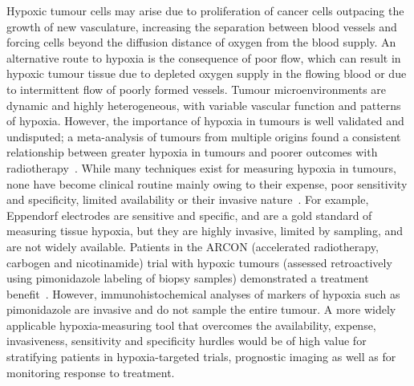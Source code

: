 Hypoxic tumour cells may arise due to proliferation of cancer cells outpacing the growth of new vasculature, increasing the separation between blood vessels and forcing cells beyond the diffusion distance of oxygen from the blood supply. 
An alternative route to hypoxia is the consequence of poor flow, which can result in hypoxic tumour tissue due to depleted oxygen supply in the flowing blood or due to intermittent flow of poorly formed vessels. 
Tumour microenvironments are dynamic and highly heterogeneous, with variable vascular function and patterns of hypoxia.
However, the importance of hypoxia in tumours is well validated and undisputed; a meta-analysis of tumours from multiple origins found a consistent relationship between greater hypoxia in tumours and poorer outcomes with radiotherapy~\cite{Horsman:2012kw}.
While many techniques exist for measuring hypoxia in tumours, none have become clinical routine mainly owing to their expense, poor sensitivity and specificity, limited availability or their invasive nature~\cite{Colliez:2017fc,Baumann:2016gr}. 
For example, Eppendorf electrodes are sensitive and specific, and are a gold standard of measuring tissue hypoxia, but they are highly invasive, limited by sampling, and are not widely available. 
Patients in the ARCON (accelerated radiotherapy, carbogen and nicotinamide) trial with hypoxic tumours (assessed retroactively using pimonidazole labeling of biopsy samples) demonstrated a treatment benefit~\cite{Kaanders:2002wl}.
However, immunohistochemical analyses of markers of hypoxia such as pimonidazole are invasive and do not sample the entire tumour.
A more widely applicable hypoxia-measuring tool that overcomes the availability, expense, invasiveness, sensitivity and specificity hurdles would be of high value for stratifying patients in hypoxia-targeted trials, prognostic imaging as well as for monitoring response to treatment. 

